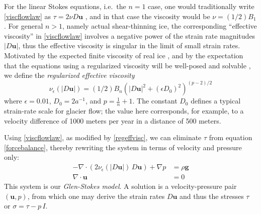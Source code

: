 \documentclass[letterpaper,final,12pt,reqno]{amsart}
\newcommand{\eps}{\epsilon}
\newcommand{\Div}{\nabla\cdot}
\newcommand{\bu}{\mathbf{u}}
\begin{document}
For the linear Stokes equations, i.e.~the $n=1$ case, one would traditionally write \eqref{viscflowlaw} as $\tau = 2\nu D\bu$ \cite{Elmanetal2014}, and in that case the viscosity would be $\nu = (1/2) B_1$.  For general $n>1$, namely actual shear-thinning ice, the corresponding ``effective viscosity'' in \eqref{viscflowlaw} involves a negative power of the strain rate magnitudes $|D\bu|$, thus the effective viscosity is singular in the limit of small strain rates.  Motivated by the expected finite viscosity of real ice \cite{GreveBlatter2009}, and by the expectation that the equations using a regularized viscosity will be well-posed and solvable \cite{JouvetRappaz2011}, we define the \emph{regularized effective viscosity}
\begin{equation}
\nu_\eps(|D\bu|) = (1/2) B_n \left(|D\bu|^2 + (\eps D_0)^2\right)^{(p-2)/2} \label{regeffvisc}
\end{equation}
where $\eps = 0.01$, $D_0 = 2 a^{-1}$, and $p=\frac{1}{n}+1$.  The constant $D_0$ defines a typical strain-rate scale for glacier flow; the value here corresponds, for example, to a velocity difference of 1000 meters per year in a distance of 500 meters.

Using \eqref{viscflowlaw}, as modified by \eqref{regeffvisc}, we can eliminate $\tau$ from equation \eqref{forcebalance}, thereby rewriting the system in terms of velocity and pressure only:
\begin{align}
- \nabla \cdot \left(2 \nu_\eps(|D\bu|)\, D\bu\right) + \nabla p &= \rho \mathbf{g} \label{stokes} \\
\Div \bu &= 0 \label{incompagain}
\end{align}
This system is our \emph{Glen-Stokes model}.  A solution is a velocity-pressure pair $(\bu,p)$, from which one may derive the strain rates $D\bu$ and thus the stresses $\tau$ or $\sigma = \tau - p\,I$.
\end{document}
